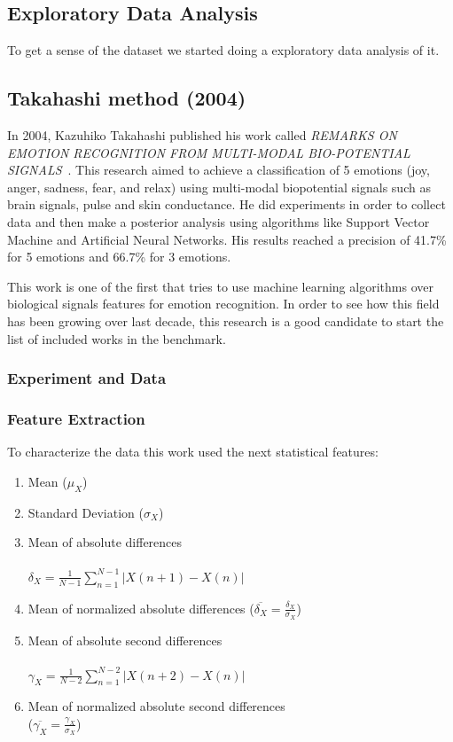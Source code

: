 \documentclass{sig-alternate}
\begin{document}
\subsection{Exploratory Data Analysis}

To get a sense of the dataset we started doing a exploratory data analysis of it. 	
	
\subsection{Takahashi method (2004)}	

In 2004, Kazuhiko Takahashi published his work called \textit{REMARKS ON EMOTION RECOGNITION FROM MULTI-MODAL BIO-POTENTIAL SIGNALS}~\cite{takahashi2004}. This research aimed to achieve a classification of 5 emotions (joy, anger, sadness, fear, and relax) using multi-modal biopotential signals such as brain signals, pulse and skin conductance. He did experiments in order to collect data and then make a posterior analysis using algorithms like Support Vector Machine and Artificial Neural Networks. His results reached a precision of 41.7\% for 5 emotions and 66.7\% for 3 emotions. 

This work is one of the first that tries to use machine learning algorithms over biological signals features for emotion recognition. In order to see how this field has been growing over last decade, this research is a good candidate to start the list of included works in the benchmark.  

\subsubsection{Experiment and Data}


\subsubsection{Feature Extraction}

To characterize the data this work used the next statistical features:
\begin{enumerate}
\item Mean ($\mu_{X}$)
\item Standard Deviation ($\sigma_{X}$)
\item Mean of absolute differences \\ \\ $\delta_{X} = \frac{1}{N-1} \sum^{N-1}_{n=1}|X(n+1)-X(n)|$
\item Mean of normalized absolute differences ($\overline{\delta_{X}} = \frac{\delta_{X}}{\sigma_{X}}$)
\item Mean of absolute second differences \\ \\ $\gamma_{X} = \frac{1}{N-2} \sum^{N-2}_{n=1}|X(n+2)-X(n)|$
\item Mean of normalized absolute second differences \\ ($\overline{\gamma_{X}} = \frac{\gamma_{X}}{\sigma_{X}}$)
\end{enumerate}  
\end{document}
